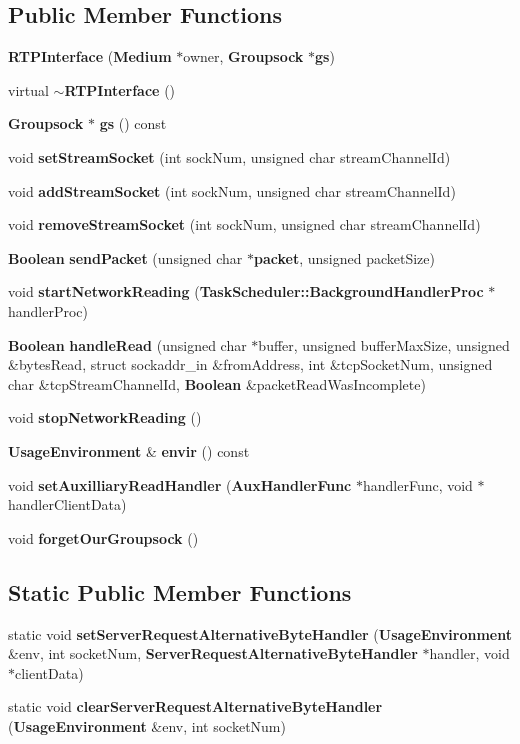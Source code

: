 \subsection*{Public Member Functions}
\begin{DoxyCompactItemize}
\item 
{\bf R\+T\+P\+Interface} ({\bf Medium} $\ast$owner, {\bf Groupsock} $\ast${\bf gs})
\item 
virtual {\bf $\sim$\+R\+T\+P\+Interface} ()
\item 
{\bf Groupsock} $\ast$ {\bf gs} () const 
\item 
void {\bf set\+Stream\+Socket} (int sock\+Num, unsigned char stream\+Channel\+Id)
\item 
void {\bf add\+Stream\+Socket} (int sock\+Num, unsigned char stream\+Channel\+Id)
\item 
void {\bf remove\+Stream\+Socket} (int sock\+Num, unsigned char stream\+Channel\+Id)
\item 
{\bf Boolean} {\bf send\+Packet} (unsigned char $\ast${\bf packet}, unsigned packet\+Size)
\item 
void {\bf start\+Network\+Reading} ({\bf Task\+Scheduler\+::\+Background\+Handler\+Proc} $\ast$handler\+Proc)
\item 
{\bf Boolean} {\bf handle\+Read} (unsigned char $\ast$buffer, unsigned buffer\+Max\+Size, unsigned \&bytes\+Read, struct sockaddr\+\_\+in \&from\+Address, int \&tcp\+Socket\+Num, unsigned char \&tcp\+Stream\+Channel\+Id, {\bf Boolean} \&packet\+Read\+Was\+Incomplete)
\item 
void {\bf stop\+Network\+Reading} ()
\item 
{\bf Usage\+Environment} \& {\bf envir} () const 
\item 
void {\bf set\+Auxilliary\+Read\+Handler} ({\bf Aux\+Handler\+Func} $\ast$handler\+Func, void $\ast$handler\+Client\+Data)
\item 
void {\bf forget\+Our\+Groupsock} ()
\end{DoxyCompactItemize}
\subsection*{Static Public Member Functions}
\begin{DoxyCompactItemize}
\item 
static void {\bf set\+Server\+Request\+Alternative\+Byte\+Handler} ({\bf Usage\+Environment} \&env, int socket\+Num, {\bf Server\+Request\+Alternative\+Byte\+Handler} $\ast$handler, void $\ast$client\+Data)
\item 
static void {\bf clear\+Server\+Request\+Alternative\+Byte\+Handler} ({\bf Usage\+Environment} \&env, int socket\+Num)
\end{DoxyCompactItemize}
